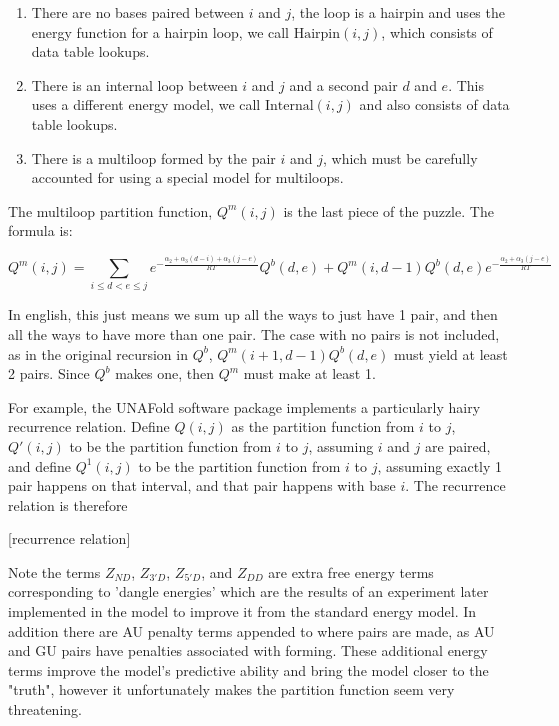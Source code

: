 \begin{enumerate}

\item

There are no bases paired between $i$ and $j$, the loop is a hairpin
and uses the energy function for a hairpin loop, we call
$\text{Hairpin}(i,j)$, which consists of data table lookups.

\item There is an internal loop between $i$ and $j$ and a second pair
$d$ and $e$. This uses a different energy model, we call
$\text{Internal}(i,j)$ and also consists of data table lookups.

\item There is a multiloop formed by the pair $i$ and $j$, which must
be carefully accounted for using a special model for multiloops.

\end{enumerate}

The multiloop partition function, $Q^m(i, j)$ is the last piece of the
puzzle. The formula is:

\begin{equation} Q^m(i, j) = \sum_{i \leq d < e \leq j}
e^{-\frac{\alpha_2 + \alpha_3(d-i) + \alpha_3(j-e)}{RT}} Q^b(d,e) +
Q^m(i, d - 1)Q^b(d, e) e^{-\frac{\alpha_2 + \alpha_3(j-e)}{RT}}
\end{equation}

In english, this just means we sum up all the ways to just have 1
pair, and then all the ways to have more than one pair. The case with
no pairs is not included, as in the original recursion in $Q^b$,
$Q^m(i+1, d-1)Q^b(d,e)$ must yield at least 2 pairs. Since $Q^b$ makes
one, then $Q^m$ must make at least 1.

For example, the UNAFold software package implements a particularly
hairy recurrence relation. Define $Q(i,j)$ as the partition function
from $i$ to $j$, $Q'(i,j)$ to be the partition function from $i$ to
$j$, assuming $i$ and $j$ are paired, and define $Q^1(i,j)$ to be the
partition function from $i$ to $j$, assuming exactly 1 pair happens on
that interval, and that pair happens with base $i$. The recurrence
relation is therefore

[recurrence relation]

Note the terms $Z_{ND}$, $Z_{3'D}$, $Z_{5'D}$, and $Z_{DD}$ are extra
free energy terms corresponding to 'dangle energies' which are the
results of an experiment later implemented in the model to improve it
from the standard energy model. In addition there are AU penalty terms
appended to where pairs are made, as AU and GU pairs have penalties
associated with forming. These additional energy terms improve the
model's predictive ability and bring the model closer to the "truth",
however it unfortunately makes the partition function seem very
threatening.

